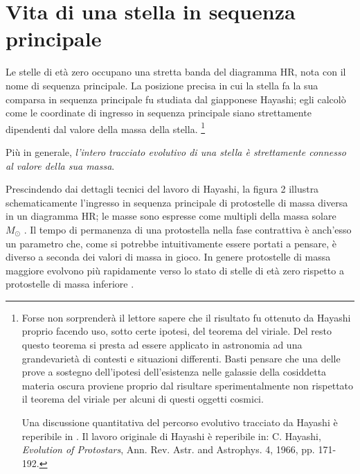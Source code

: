 \section{Vita di una stella in sequenza principale}\label{sp}
Le stelle di et\`{a} zero occupano una stretta banda del diagramma HR, nota con il nome di sequenza principale. La posizione precisa in cui la stella fa la sua comparsa in sequenza principale fu studiata dal giapponese Hayashi;
egli calcolò come le coordinate di ingresso in sequenza principale siano strettamente dipendenti dal valore della massa della stella.
\footnote{Forse non sorprender\`{a} il lettore sapere che il risultato fu ottenuto da Hayashi proprio facendo uso, sotto certe ipotesi, del teorema del viriale. Del resto questo teorema si presta ad essere applicato in astronomia ad una grandevariet\`{a} di contesti e situazioni differenti. Basti pensare che una delle prove a sostegno dell'ipotesi dell'esistenza nelle galassie della cosiddetta materia oscura proviene proprio dal risultare sperimentalmente non rispettato il teorema del viriale per alcuni di questi oggetti cosmici.
\par
Una discussione quantitativa del percorso evolutivo tracciato da Hayashi è reperibile in \Cite{collins}.  Il lavoro originale di Hayashi è reperibile in: C. Hayashi, \emph{Evolution of Protostars}, Ann. Rev. Astr. and Astrophys. 4, 1966, pp. 171-192.}
\par
Più in generale, \emph{l'intero tracciato evolutivo di una stella è strettamente connesso al valore della sua massa}.
\par
Prescindendo dai dettagli tecnici del lavoro di Hayashi, la figura 2 illustra schematicamente l'ingresso in sequenza principale di protostelle di massa diversa in un diagramma HR; le masse sono espresse come multipli della massa solare $M_{\odot}$ \Cite{collins}.
Il tempo di permanenza di una protostella nella fase contrattiva è anch'esso un parametro che, come si potrebbe intuitivamente essere portati a pensare, è diverso a seconda dei valori di massa in gioco. In genere protostelle di massa maggiore evolvono più rapidamente verso lo stato di stelle di et\`{a} zero rispetto a protostelle di massa inferiore \Cite{rosino}.

